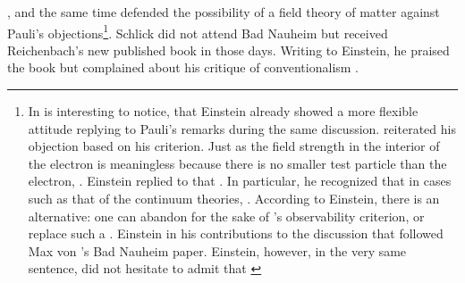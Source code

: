 \documentclass[draft]{article}
\renewcommand{\me}{;~m.e.{}}
\begin{document}
{}, and the same time defended the possibility of a field theory of matter against Pauli's objections\footnote{In is interesting to notice, that Einstein already showed a more flexible attitude replying to Pauli's remarks during the same discussion. \Pauli reiterated his objection based on his  criterion. Just as the field strength in the interior of the electron is meaningless because there is no smaller test particle than the electron,  \citep[650]{Einstein1920c}. Einstein replied to \Pauli that  \citep[650]{Einstein1920c}. In particular, he recognized that in cases such as that of the continuum theories,  \citep[650]{Einstein1920c}. According to Einstein, there is an alternative: one can abandon  for the sake of \Pauli's observability criterion, or replace such a  \citep[650]{Einstein1920c}. Einstein in his contributions to the discussion that followed Max von 's Bad Nauheim paper. Einstein, however, in the very same sentence, did not hesitate to admit that  \citep[Einstein's reply to][662\me]{Laue1920}}. Schlick did not attend Bad Nauheim but received Reichenbach's new published book in those days. Writing to Einstein, he praised the book but complained about his critique of conventionalism . 
\end{document}
